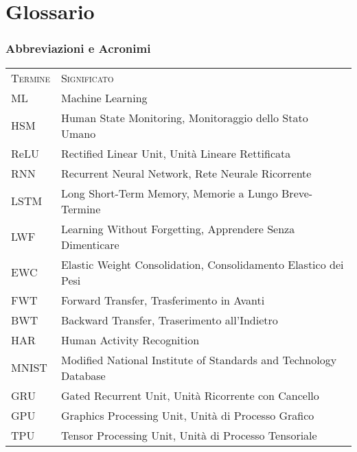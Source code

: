 \chapter*{Glossario}

\subsection*{Abbreviazioni e Acronimi}
\begin{table}[h!]
	\begin{center}
		\begin{tabularx}{\textwidth}{ll}
			\toprule
			\textsc{Termine} & \textsc{Significato} \\ 
			ML & Machine Learning\\
			HSM & Human State Monitoring, Monitoraggio dello Stato Umano\\
			ReLU & Rectified Linear Unit, Unità Lineare Rettificata\\
			RNN & Recurrent Neural Network, Rete Neurale Ricorrente\\
			LSTM & Long Short-Term Memory, Memorie a Lungo Breve-Termine\\
			LWF & Learning Without Forgetting, Apprendere Senza Dimenticare\\
			EWC & Elastic Weight Consolidation, Consolidamento Elastico dei Pesi\\
			FWT & Forward Transfer, Trasferimento in Avanti\\
			BWT & Backward Transfer, Traserimento all'Indietro\\
			HAR & Human Activity Recognition\\
			MNIST & Modified National Institute of Standards and Technology Database\\
			GRU & Gated Recurrent Unit, Unità Ricorrente con Cancello\\  %
			GPU & Graphics Processing Unit, Unità di Processo Grafico\\
			TPU & Tensor Processing Unit, Unità di Processo Tensoriale\\
		\end{tabularx}
	\end{center}
\end{table}